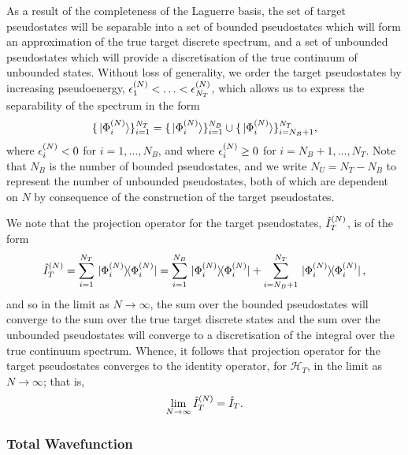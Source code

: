 \documentclass[draft]{article}
\begin{document}
As a result of the completeness of the Laguerre basis, the set of target
pseudostates will be separable into a set of bounded pseudostates which will
form an approximation of the true target discrete spectrum, and a set of
unbounded pseudostates which will provide a discretisation of the true continuum
of unbounded states.
Without loss of generality, we order the target pseudostates by increasing
pseudoenergy, $\epsilon_{1}^{(N)} < \dotsc < \epsilon_{N_{T}}^{(N)}$,
which allows us to express the separability of the spectrum in the form
\begin{equation}
  \label{eq:target-spectrum-separable}
  \lbrace\ket*{\Phi_{i}^{(N)}}\rbrace_{i = 1}^{N_{T}}
  =
  \lbrace\ket*{\Phi_{i}^{(N)}}\rbrace_{i = 1}^{N_{B}}
  \cup
  \lbrace\ket*{\Phi_{i}^{(N)}}\rbrace_{i = N_{B} + 1}^{N_{T}}
  ,
\end{equation}
where $\epsilon_{i}^{(N)} < 0$ for $i = 1, \dotsc, N_{B}$, and where
$\epsilon_{i}^{(N)} \geq 0$ for $i = N_{B} + 1, \dotsc, N_{T}$.
Note that $N_{B}$ is the number of bounded pseudostates, and we write
$N_{U} = N_{T} - N_{B}$ to represent the number of unbounded pseudostates, both of
which are dependent on $N$ by consequence of the construction of the target
pseudostates.

We note that the projection operator for the target pseudostates,
$\hat{I}_{T}^{(N)}$, is of the form
\begin{equation}
  \label{eq:target-projection}
  \hat{I}_{T}^{(N)}
  =
  \sum_{i = 1}^{N_{T}}
  \ketbra*
  {\Phi_{i}^{(N)}}
  {\Phi_{i}^{(N)}}
  =
  \sum_{i = 1}^{N_{B}}
  \ketbra*
  {\Phi_{i}^{(N)}}
  {\Phi_{i}^{(N)}}
  +
  \sum_{i = N_{B} + 1}^{N_{T}}
  \ketbra*
  {\Phi_{i}^{(N)}}
  {\Phi_{i}^{(N)}}
  ,
\end{equation}
and so in the limit as $N \to \infty$, the sum over the bounded pseudostates
will converge to the sum over the true target discrete states
and the sum over the unbounded pseudostates will converge to a discretisation of
the integral over the true continuum spectrum.
Whence, it follows that projection operator for the target pseudostates
converges to the identity operator, for $\mathcal{H}_{T}$,
in the limit as $N \to \infty$; that is,
\begin{equation}
  \label{eq:target-projection-convergence}
  \lim_{N \to \infty}
  \hat{I}_{T}^{(N)}
  =
  \hat{I}_{T}
  .
\end{equation}

\subsubsection{Total Wavefunction}
\label{sec:total-wavefunction}
\end{document}
